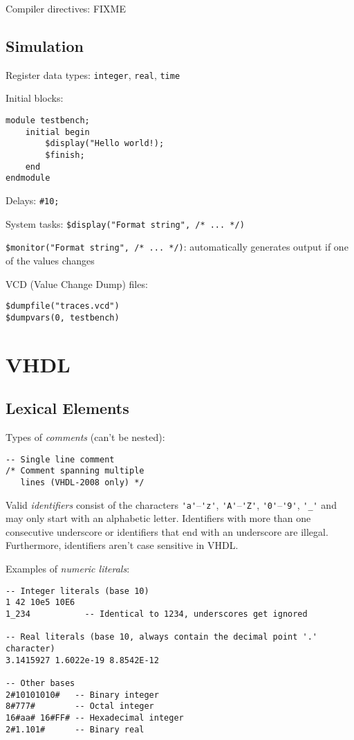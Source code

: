 \documentclass[fontsize=11pt,a4paper]{scrartcl}
\begin{document}
Compiler directives: FIXME
%
%
%
%
\subsection{Simulation}
Register data types: \lstinline!integer!, \lstinline!real!, \lstinline!time!

Initial blocks:
\begin{lstlisting}
module testbench;
	initial begin
		$display("Hello world!);
		$finish;
	end
endmodule
\end{lstlisting}

Delays: \lstinline!#10;!

System tasks: \lstinline!$display("Format string", /* ... */)!

\lstinline!$monitor("Format string", /* ... */)!: automatically generates output if one of the values changes

VCD (Value Change Dump) files:
\begin{lstlisting}
$dumpfile("traces.vcd")
$dumpvars(0, testbench)
\end{lstlisting}
%
%
%
%
%
\section{VHDL}
\subsection{Lexical Elements}
Types of \emph{comments} (can't be nested):
\begin{lstlisting}
-- Single line comment
/* Comment spanning multiple
   lines (VHDL-2008 only) */
\end{lstlisting}

Valid \emph{identifiers} consist of the characters \lstinline!'a'!--\lstinline!'z'!, \lstinline!'A'!--\lstinline!'Z'!, \lstinline!'0'!--\lstinline!'9'!, \lstinline!'_'! and may only start with an alphabetic letter. Identifiers with more than one consecutive underscore or identifiers that end with an underscore are illegal. Furthermore, identifiers aren't case sensitive in VHDL.

Examples of \emph{numeric literals}:
\begin{lstlisting}
-- Integer literals (base 10)
1 42 10e5 10E6
1_234           -- Identical to 1234, underscores get ignored

-- Real literals (base 10, always contain the decimal point '.' character)
3.1415927 1.6022e-19 8.8542E-12

-- Other bases
2#10101010#   -- Binary integer
8#777#        -- Octal integer
16#aa# 16#FF# -- Hexadecimal integer
2#1.101#      -- Binary real
\end{lstlisting}
\end{document}
